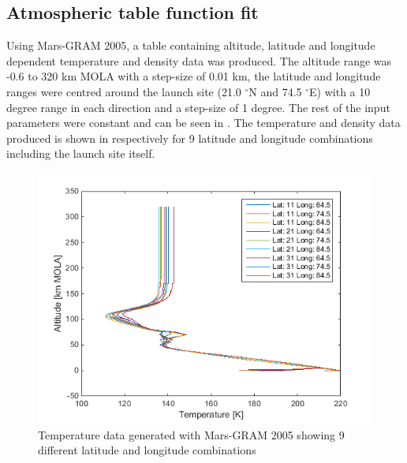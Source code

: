 %

\subsection{Atmospheric table function fit}
\label{subsec:atmofuncfit}
Using Mars-\ac{GRAM} 2005, a table containing altitude, latitude and longitude dependent temperature and density data was produced. The altitude range was -0.6 to 320 km \ac{MOLA} with a step-size of 0.01 km, the latitude and longitude ranges were centred around the launch site (21.0 $^\circ$N and 74.5 $^\circ$E) with a 10 degree range in each direction and a step-size of 1 degree. The rest of the input parameters were constant and can be seen in . The temperature and density data produced is shown in  respectively for 9 latitude and longitude combinations including the launch site itself.                                                                                                                                                                                                                                                                                                                                                                                                                                                                                          


\begin{figure}[!ht]
\centering
\includegraphics[width=1.0\textwidth]{figures/software/temperatureData.png}
\caption{Temperature data generated with Mars-\ac{GRAM} 2005 showing 9 different latitude and longitude combinations}
\label{fig:temperatureData}
\end{figure}


